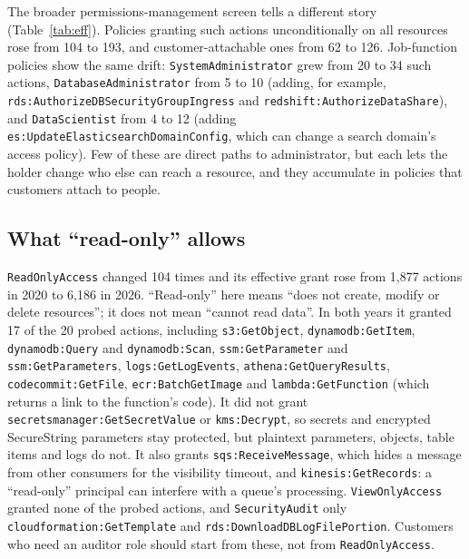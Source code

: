 \documentclass[journal]{IEEEtran}
\begin{document}
The broader permissions-management screen tells a different story (Table~\ref{tab:eff}). Policies granting such actions unconditionally
on all resources rose from 104 to 193, and customer-attachable ones from 62 to 126. Job-function policies show the same drift:
\texttt{SystemAdministrator} grew from 20 to 34 such actions, \texttt{DatabaseAdministrator} from 5 to 10 (adding, for example,
\texttt{rds:AuthorizeDBSecurityGroupIngress} and \texttt{redshift:AuthorizeDataShare}), and \texttt{DataScientist} from 4 to 12 (adding
\texttt{es:UpdateElasticsearchDomainConfig}, which can change a search domain's access policy). Few of these are direct paths to
administrator, but each lets the holder change who else can reach a resource, and they accumulate in policies that customers attach to
people.

\subsection{What ``read-only'' allows}
\label{sec:ro}
\texttt{ReadOnlyAccess} changed 104 times and its effective grant rose from 1{,}877 actions in 2020 to 6{,}186 in 2026. ``Read-only'' here
means ``does not create, modify or delete resources''; it does not mean ``cannot read data''. In both years it granted 17 of the 20
probed actions, including \texttt{s3:GetObject}, \texttt{dynamodb:GetItem}, \texttt{dynamodb:Query} and \texttt{dynamodb:Scan},
\texttt{ssm:GetParameter} and \texttt{ssm:GetParameters}, \texttt{logs:GetLogEvents}, \texttt{athena:GetQueryResults},
\texttt{codecommit:GetFile}, \texttt{ecr:BatchGetImage} and \texttt{lambda:GetFunction} (which returns a link to the function's code). It
did not grant \texttt{secretsmanager:GetSecretValue} or \texttt{kms:Decrypt}, so secrets and encrypted SecureString parameters stay
protected, but plaintext parameters, objects, table items and logs do not. It also grants \texttt{sqs:ReceiveMessage}, which hides a
message from other consumers for the visibility timeout, and \texttt{kinesis:GetRecords}: a ``read-only'' principal can interfere with a
queue's processing. \texttt{ViewOnlyAccess} granted none of the probed actions, and \texttt{SecurityAudit} only
\texttt{cloudformation:GetTemplate} and \texttt{rds:DownloadDBLogFilePortion}. Customers who need an auditor role should start from
these, not from \texttt{ReadOnlyAccess}.
\end{document}

